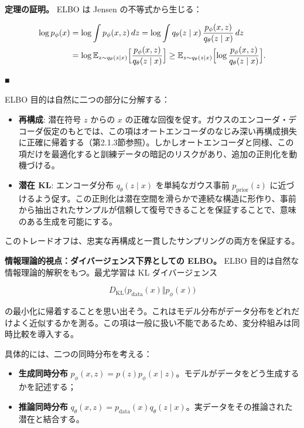 \textbf{定理の証明。}
ELBO は Jensen の不等式から生じる：

\begin{align*}
\begin{aligned}
\log p_\phi(x)
&= \log \int p_\phi(x,z)\, dz
= \log \int q_\theta(z\mid x)\, \frac{p_\phi(x,z)}{q_\theta(z\mid x)}\, dz \\
&= \log \mathbb{E}_{z\sim q_\theta(z\mid x)}\Bigl[\frac{p_\phi(x,z)}{q_\theta(z\mid x)}\Bigr]
\ge \mathbb{E}_{z\sim q_\theta(z\mid x)}\Bigl[\log \frac{p_\phi(x,z)}{q_\theta(z\mid x)}\Bigr].
\end{aligned}
\end{align*}


■

ELBO 目的は自然に二つの部分に分解する：

\begin{itemize}
\item \textbf{再構成}: 潜在符号 $z$ からの $x$ の正確な回復を促す。ガウスのエンコーダ・デコーダ仮定のもとでは、この項はオートエンコーダのなじみ深い再構成損失に正確に帰着する（第2.1.3節参照）。しかしオートエンコーダと同様、この項だけを最適化すると訓練データの暗記のリスクがあり、追加の正則化を動機づける。
\end{itemize}


\begin{itemize}
\item \textbf{潜在 KL}: エンコーダ分布 $q_\theta(z\mid x)$ を単純なガウス事前 $p_{\mathrm{prior}}(z)$ に近づけるよう促す。この正則化は潜在空間を滑らかで連続な構造に形作り、事前から抽出されたサンプルが信頼して復号できることを保証することで、意味のある生成を可能にする。
\end{itemize}


このトレードオフは、忠実な再構成と一貫したサンプリングの両方を保証する。

\textbf{情報理論的視点：ダイバージェンス下界としての ELBO。} ELBO 目的は自然な情報理論的解釈をもつ。最尤学習は KL ダイバージェンス

\[
D_{\mathrm{KL}}\bigl(p_{\mathrm{data}}(x)\Vert p_\phi(x)\bigr)
\]


の最小化に帰着することを思い出そう。これはモデル分布がデータ分布をどれだけよく近似するかを測る。この項は一般に扱い不能であるため、変分枠組みは同時比較を導入する。

具体的には、二つの同時分布を考える：

\begin{itemize}
\item \textbf{生成同時分布} $p_\phi(x,z) = p(z)p_\phi(x\mid z)$。モデルがデータをどう生成するかを記述する；
\item \textbf{推論同時分布} $q_\theta(x,z) = p_{\mathrm{data}}(x)q_\theta(z\mid x)$。実データをその推論された潜在と結合する。
\end{itemize}


